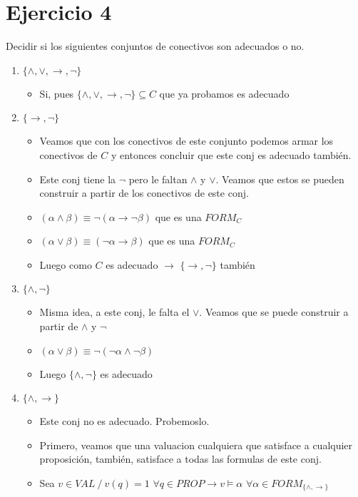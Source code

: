 \documentclass[14pt,a4paper,fleqn]{article}
\newcommand{\entonces}{\rightarrow}
\newcommand{\satisface}{\vDash}
\newcommand{\conj}[2]{(#1 \wedge #2)}
\newcommand{\disj}[2]{(#1 \vee #2)}
\begin{document}
\section*{Ejercicio 4}
Decidir si los siguientes conjuntos de conectivos son adecuados o no.
\begin{enumerate}
	\item $\{ \wedge, \vee, \entonces, \neg  \}$
	\begin{itemize}
		\item Si, pues $\{ \wedge, \vee, \entonces, \neg \} \subseteq C$ que ya probamos es adecuado
	\end{itemize}
	\item $\{ \entonces, \neg \}$
	\begin{itemize}
		\item Veamos que con los conectivos de este conjunto podemos armar los conectivos de $C$ y entonces concluir que este conj es adecuado también.
		\item Este conj tiene la $\neg$ pero le faltan $\wedge$ y $\vee$. Veamos que estos se pueden construir a partir de los conectivos de este conj.
		\item $\conj \alpha \beta \equiv \neg(\alpha \entonces \neg \beta)$ que es una $FORM_{C}$
		\item $\disj \alpha \beta \equiv (\neg\alpha \entonces \beta)$ que es una $FORM_{C}$
		\item Luego como $C$ es adecuado $\entonces$ $\{ \entonces, \neg \}$ también
	\end{itemize}	
	\item $\{ \wedge, \neg \}$
	\begin{itemize}
		\item Misma idea, a este conj, le falta el $\vee$. Veamos que se puede construir a partir de $\wedge$ y $\neg$
		\item $\disj \alpha \beta \equiv \neg(\neg \alpha \wedge \neg \beta)$
		\item Luego $\{ \wedge, \neg \}$ es adecuado
	\end{itemize}
	\item $\{ \wedge, \entonces \}$
	\begin{itemize}
		\item Este conj no es adecuado. Probemoslo.
		\item Primero, veamos que una valuacion cualquiera que satisface a cualquier proposición, también, satisface a todas las formulas de este conj.
		\item Sea $v \in VAL \: / \: v(q) = 1$ $\forall q \in PROP \entonces v \satisface \alpha$ $\forall \alpha\in FORM_{\{\wedge, \entonces \}}$

\end{itemize}
\end{enumerate}
\end{document}

